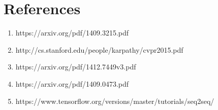 \documentclass[12pt]{article}
\begin{document}
\section{References}

\begin{enumerate}

\item https://arxiv.org/pdf/1409.3215.pdf
\item http://cs.stanford.edu/people/karpathy/cvpr2015.pdf
\item https://arxiv.org/pdf/1412.7449v3.pdf
\item https://arxiv.org/pdf/1409.0473.pdf
\item https://www.tensorflow.org/versions/master/tutorials/seq2seq/

\end{enumerate}


\end{document}
